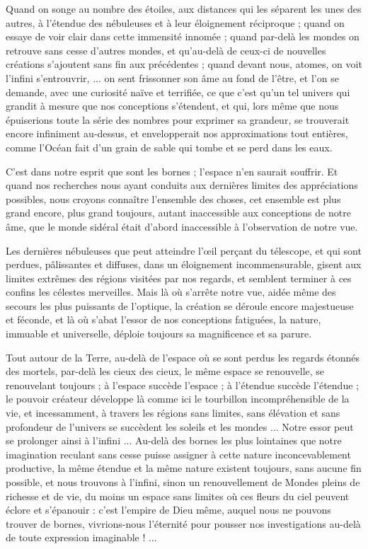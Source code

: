 \documentclass[a4paper, 11pt, oneside, landscape]{article}
\begin{document}
Quand on songe au nombre des étoiles, aux distances qui les séparent les unes des autres, à l'étendue des nébuleuses et à leur éloignement réciproque ; quand on essaye de voir clair dans cette immensité innomée ; quand par-delà les mondes on retrouve sans cesse d'autres mondes, et qu'au-delà de ceux-ci de nouvelles créations s'ajoutent sans fin aux précédentes ; quand devant nous, atomes, on voit l'infini s'entrouvrir, ... on sent frissonner son âme au fond de l'être, et l'on se demande, avec une curiosité naïve et terrifiée, ce que c'est qu'un tel univers qui grandit à mesure que nos conceptions s'étendent, et qui, lors même que nous épuiserions toute la série des nombres pour exprimer sa grandeur, se trouverait encore infiniment au-dessus, et envelopperait nos approximations tout entières, comme l'Océan fait d'un grain de sable qui tombe et se perd dans les eaux.

C'est dans notre esprit que sont les bornes ; l'espace n'en saurait souffrir. Et quand nos recherches nous ayant conduits aux dernières limites des appréciations possibles, nous croyons connaître l'ensemble des choses, cet ensemble est plus grand encore, plus grand toujours, autant inaccessible aux conceptions de notre âme, que le monde sidéral était d'abord inaccessible à l'observation de notre vue.

Les dernières nébuleuses que peut atteindre l'œil perçant du télescope, et qui sont perdues, pâlissantes et diffuses, dans un éloignement incommensurable, gisent aux limites extrêmes des régions visitées par nos regards, et semblent terminer à ces confins les célestes merveilles. Mais là où s'arrête notre vue, aidée même des secours les plus puissants de l'optique, la création se déroule encore majestueuse et féconde, et là où s'abat l'essor de nos conceptions fatiguées, la nature, immuable et universelle, déploie toujours sa magnificence et sa parure.

Tout autour de la Terre, au-delà de l'espace où se sont perdus les regards étonnés des mortels, par-delà les cieux des cieux, le même espace se renouvelle, se renouvelant toujours ; à l'espace succède l'espace ; à l'étendue succède l'étendue ; le pouvoir créateur développe là comme ici le tourbillon incompréhensible de la vie, et incessamment, à travers les régions sans limites, sans élévation et sans profondeur de l'univers se succèdent les soleils et les mondes ... Notre essor peut se prolonger ainsi à l'infini ... Au-delà des bornes les plus lointaines que notre imagination reculant sans cesse puisse assigner à cette nature inconcevablement productive, la même étendue et la même nature existent toujours, sans aucune fin possible, et nous trouvons à l'infini, sinon un renouvellement de Mondes pleins de richesse et de vie, du moins un espace sans limites où ces fleurs du ciel peuvent éclore et s'épanouir : c'est l'empire de Dieu même, auquel nous ne pouvons trouver de bornes, vivrions-nous l'éternité pour pousser nos investigations au-delà de toute expression imaginable ! ...
\end{document}
